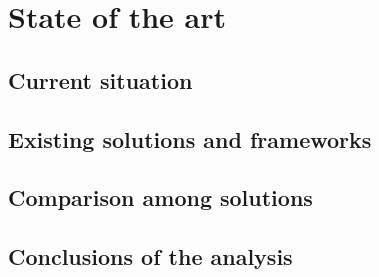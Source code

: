 \chapter{State of the art}
\label{ch:state-of-the-art}


\section{Current situation}

\section{Existing solutions and frameworks}

\section{Comparison among solutions}

\section{Conclusions of the analysis}

